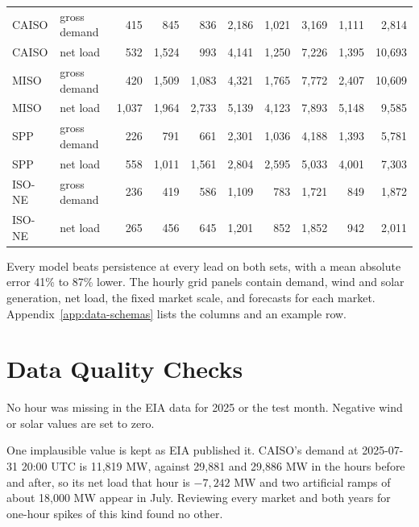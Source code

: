 \documentclass{UNCC-thesis}
\newcommand{\planned}[1]{\par\noindent[\emph{planned:} #1]\par}
\begin{document}
\begin{table}[htbp]
\begin{tabular}{@{}llrrrrrrrr@{}}
    CAISO          & gross demand &   415 &   845 &   836 & 2,186 & 1,021 & 3,169 & 1,111 &  2,814 \\
    CAISO          & net load     &   532 & 1,524 &   993 & 4,141 & 1,250 & 7,226 & 1,395 & 10,693 \\
    MISO           & gross demand &   420 & 1,509 & 1,083 & 4,321 & 1,765 & 7,772 & 2,407 & 10,609 \\
    MISO           & net load     & 1,037 & 1,964 & 2,733 & 5,139 & 4,123 & 7,893 & 5,148 &  9,585 \\
    SPP            & gross demand &   226 &   791 &   661 & 2,301 & 1,036 & 4,188 & 1,393 &  5,781 \\
    SPP            & net load     &   558 & 1,011 & 1,561 & 2,804 & 2,595 & 5,033 & 4,001 &  7,303 \\
    ISO-NE         & gross demand &   236 &   419 &   586 & 1,109 &   783 & 1,721 &   849 &  1,872 \\
    ISO-NE         & net load     &   265 &   456 &   645 & 1,201 &   852 & 1,852 &   942 &  2,011 \\
    \bottomrule
  \end{tabular}
\end{table}

Every model beats persistence at every lead on both sets, with a mean
absolute error 41\% to 87\% lower. The hourly grid panels contain demand, wind and solar generation, net load, the fixed market scale, and forecasts for each market. Appendix~\ref{app:data-schemas} lists the columns and an example row.

\section{Data Quality Checks}
\label{sec:data-quality}

No hour was missing in the EIA data for 2025 or the test month. Negative
wind or solar values are set to zero.

One implausible value is kept as EIA published it. CAISO's demand at
2025-07-31 20:00 UTC is 11,819 MW, against 29,881 and 29,886 MW in the hours
before and after, so its net load that hour is \(-7{,}242\) MW and two
artificial ramps of about 18,000 MW appear in July. Reviewing every market
and both years for one-hour spikes of this kind found no other.
\end{document}
